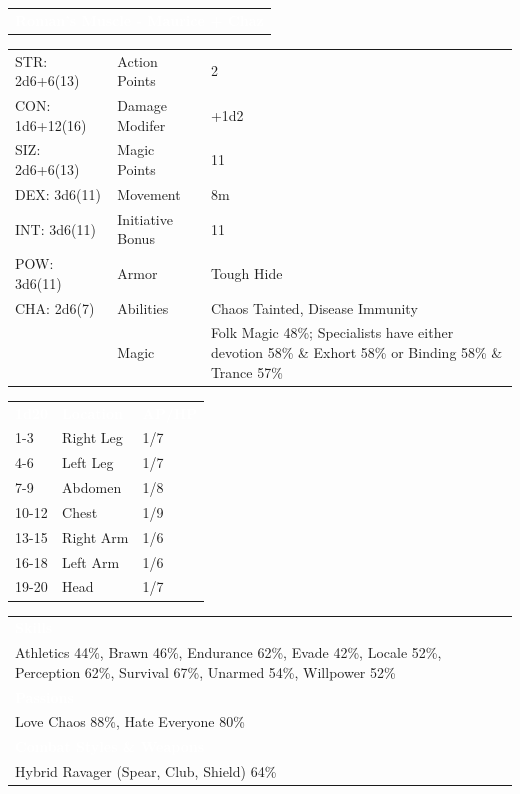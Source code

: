 \documentclass[letterpaper,serif]{rpg-module}
\begin{document}
\noindent\begin{tabularx}{\linewidth}{X}
\rowcolor{gray}
\textcolor{white}{\textbf{Roman's Muscle - Maurice + Chaz }}
\end{tabularx}
\begin{tabularx}{\linewidth}{XXX}
STR: 2d6+6(13) & Action Points & 2 \\
CON: 1d6+12(16) & Damage Modifer & +1d2 \\
SIZ: 2d6+6(13) & Magic Points & 11 \\
DEX: 3d6(11) & Movement & 8m \\
INT: 3d6(11) & Initiative Bonus & 11 \\
POW: 3d6(11) & Armor & Tough Hide \\
CHA: 2d6(7) & Abilities & Chaos Tainted, Disease Immunity \\
    & Magic & Folk Magic 48\%; Specialists have either devotion 58\% \& Exhort 58\% or Binding 58\% \& Trance 57\%
\end{tabularx}

\begin{tabularx}{\linewidth}{XXX}
\rowcolor{gray}
\textcolor{white}{\textbf{1d20}} & \textcolor{white}{\textbf{Location}} & \textcolor{white}{\textbf{AP/HP}} \\
1-3 & Right Leg & 1/7 \\
4-6 & Left Leg & 1/7 \\
7-9 & Abdomen & 1/8 \\
10-12 & Chest & 1/9 \\
13-15 & Right Arm & 1/6 \\
16-18 & Left Arm & 1/6 \\
19-20 & Head & 1/7 
\end{tabularx}

\begin{tabularx}{\linewidth}{X}
\rowcolor{gray}
\textcolor{white}{\textbf{Skills}} \\
Athletics 44\%, Brawn 46\%, Endurance 62\%, Evade 42\%, Locale 52\%, Perception 62\%, Survival 67\%, Unarmed 54\%, Willpower 52\%\\
\rowcolor{gray}
\textcolor{white}{\textbf{Passions}} \\
Love Chaos 88\%, Hate Everyone 80\% \\
\rowcolor{gray}
\textcolor{white}{\textbf{Combat Styles \& Weapons}} \\
Hybrid Ravager (Spear, Club, Shield) 64\%
\end{tabularx}
\end{document}

